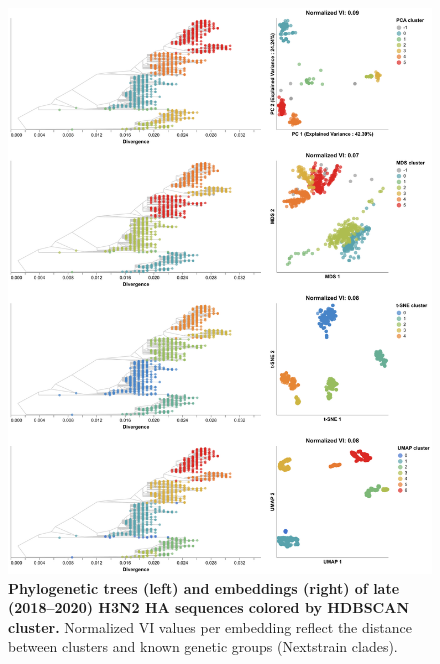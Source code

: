 \documentclass[10pt,letterpaper]{article}
\begin{document}
\begin{figure}[!h]
\includegraphics[width=\columnwidth]{figures/flu-2018-2020-ha-embeddings-by-cluster.png}
\caption{{\bf Phylogenetic trees (left) and embeddings (right) of late (2018--2020) H3N2 HA sequences colored by HDBSCAN cluster.}
Normalized VI values per embedding reflect the distance between clusters and known genetic groups (Nextstrain clades).}
\label{fig:seasonal-influenza-h3n2-ha-2018-2020-clusters}
\end{figure}
\end{document}
